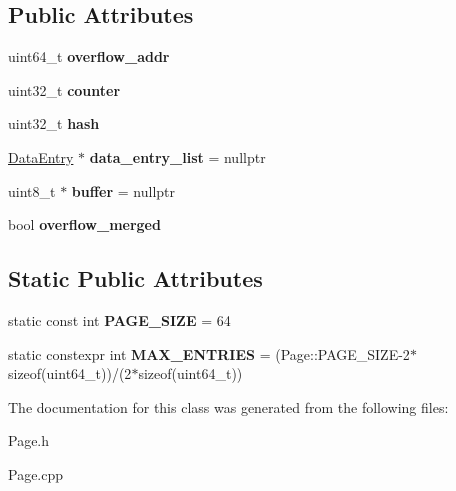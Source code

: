 \subsection*{Public Attributes}
\begin{DoxyCompactItemize}
\item 
\hypertarget{class_page_af4274422131fc6e432650f47a3b18ca1}{}uint64\+\_\+t {\bfseries overflow\+\_\+addr}\label{class_page_af4274422131fc6e432650f47a3b18ca1}

\item 
\hypertarget{class_page_aaf8d2ff8db86b06812f9020a54599d28}{}uint32\+\_\+t {\bfseries counter}\label{class_page_aaf8d2ff8db86b06812f9020a54599d28}

\item 
\hypertarget{class_page_a2c002ece8b3ceb2208e5c47c2325749a}{}uint32\+\_\+t {\bfseries hash}\label{class_page_a2c002ece8b3ceb2208e5c47c2325749a}

\item 
\hypertarget{class_page_a3ca5b29177f41a614d8124c7013b64a5}{}\hyperlink{class_data_entry}{Data\+Entry} $\ast$ {\bfseries data\+\_\+entry\+\_\+list} = nullptr\label{class_page_a3ca5b29177f41a614d8124c7013b64a5}

\item 
\hypertarget{class_page_a6dc030c120ee33bbfadbe9dba191dc93}{}uint8\+\_\+t $\ast$ {\bfseries buffer} = nullptr\label{class_page_a6dc030c120ee33bbfadbe9dba191dc93}

\item 
\hypertarget{class_page_adbd1fbdf77dbc3a6f691cee74b17166a}{}bool {\bfseries overflow\+\_\+merged}\label{class_page_adbd1fbdf77dbc3a6f691cee74b17166a}

\end{DoxyCompactItemize}
\subsection*{Static Public Attributes}
\begin{DoxyCompactItemize}
\item 
\hypertarget{class_page_ae213c81894f5b25ab59017f40c2697cd}{}static const int {\bfseries P\+A\+G\+E\+\_\+\+S\+I\+Z\+E} = 64\label{class_page_ae213c81894f5b25ab59017f40c2697cd}

\item 
\hypertarget{class_page_a463fba97b1e91d7e94fc4f9fe71064f0}{}static constexpr int {\bfseries M\+A\+X\+\_\+\+E\+N\+T\+R\+I\+E\+S} = (Page\+::\+P\+A\+G\+E\+\_\+\+S\+I\+Z\+E-\/2$\ast$sizeof(uint64\+\_\+t))/(2$\ast$sizeof(uint64\+\_\+t))\label{class_page_a463fba97b1e91d7e94fc4f9fe71064f0}

\end{DoxyCompactItemize}


The documentation for this class was generated from the following files\+:\begin{DoxyCompactItemize}
\item 
Page.\+h\item 
Page.\+cpp\end{DoxyCompactItemize}
